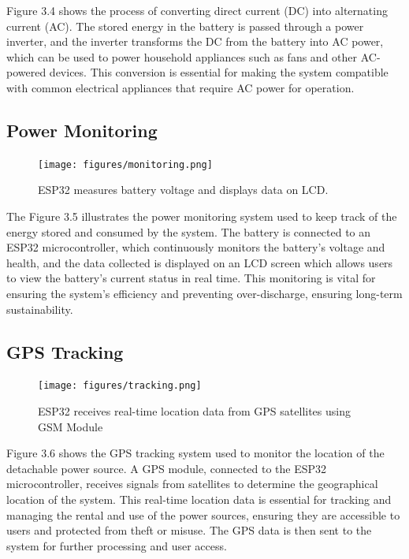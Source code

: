 {Figure 3.4 shows the process of converting direct current (DC) into alternating current (AC). The stored energy in the  battery is passed through a power inverter, and the inverter transforms the DC from the battery into AC power, which can be used to power household appliances such as fans and other AC-powered devices. This conversion is essential for making the system compatible with common electrical appliances that require AC power for operation.

\subsection{Power Monitoring}

\begin{figure}[H]
	\centering
	\caption{ESP32 measures battery voltage and displays data on LCD.}
	\label{fig:power monitoring}
	\texttt{[image: figures/monitoring.png]}
\end{figure}

The Figure 3.5 illustrates the power monitoring system used to keep track of the energy stored and consumed by the system. The  battery is connected to an ESP32 microcontroller, which continuously monitors the battery’s voltage and health, and the data collected is displayed on an LCD screen which allows users to view the battery's current status in real time. This monitoring is vital for ensuring the system's efficiency and preventing over-discharge, ensuring long-term sustainability.


\subsection{GPS Tracking}

\begin{figure}[H]
	\centering
	\caption{ESP32 receives real-time location data from GPS satellites using GSM Module}
	\label{fig:gps tracking}
	\texttt{[image: figures/tracking.png]}
\end{figure}

Figure 3.6 shows the GPS tracking system used to monitor the location of the detachable power source. A GPS module, connected to the ESP32 microcontroller, receives signals from satellites to determine the geographical location of the system. This real-time location data is essential for tracking and managing the rental and use of the power sources, ensuring they are accessible to users and protected from theft or misuse. The GPS data is then sent to the system for further processing and user access.


}
